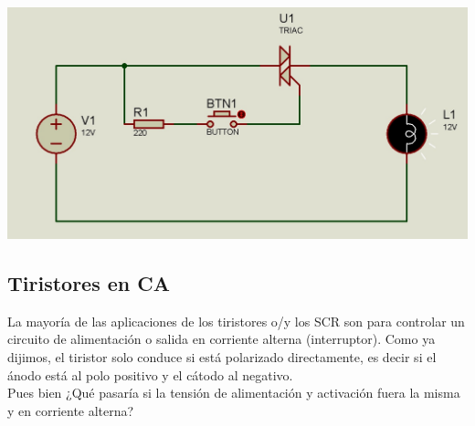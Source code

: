 \documentclass[12pt,a4paper]{article}
\begin{document}
\begin{center}
\includegraphics[scale=0.4]{imagenes/tiristor2.JPG} 
\end{center}
\newpage
\begin{flushleft}
\section {Tiristores en CA}
\end{flushleft}
La mayoría de las aplicaciones de los tiristores o/y los SCR son para controlar un circuito de alimentación o salida en corriente alterna (interruptor). Como ya dijimos, el tiristor solo conduce si está polarizado directamente, es decir si el ánodo está al polo positivo y el cátodo al negativo.\\ Pues bien ¿Qué pasaría si la tensión de alimentación y activación fuera la misma y en corriente alterna? \\
\end{document}
